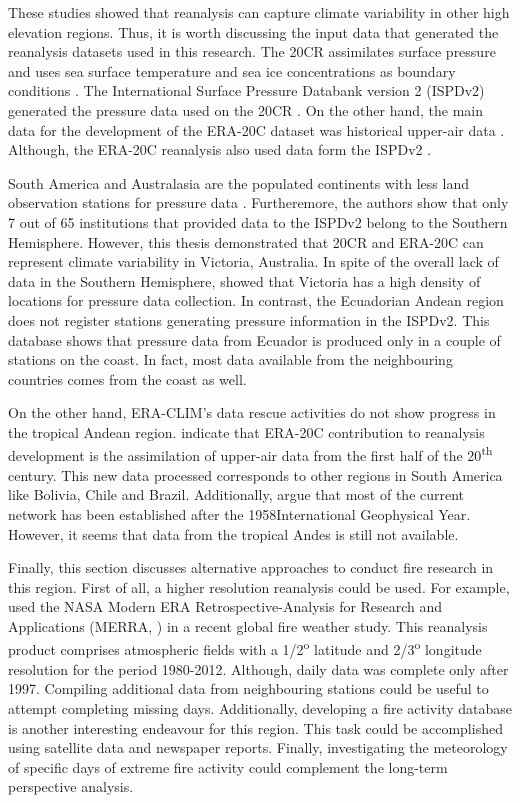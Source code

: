 These studies showed that reanalysis can capture climate variability
in other high elevation regions. Thus, it is worth discussing the
input data that generated the reanalysis datasets used in this research.
The 20CR assimilates surface pressure and uses sea surface temperature
and sea ice concentrations as boundary conditions \citep{Compo2011}.
The International Surface Pressure Databank version 2 (ISPDv2) generated
the pressure data used on the 20CR \citep{Cram2015}. On the other
hand, the main data for the development of the ERA-20C dataset was
historical upper-air data \citep{Stickler2014,Stickler2014a}. Although,
the ERA-20C reanalysis also used data form the ISPDv2 \citep{Poli2013,Cram2015}. 

South America and Australasia are the populated continents with less
land observation stations for pressure data \citep{Cram2015}. Furtheremore,
the authors show that only 7 out of 65 institutions that provided
data to the ISPDv2 belong to the Southern Hemisphere. However, this
thesis demonstrated that 20CR and ERA-20C can represent climate variability
in Victoria, Australia. In spite of the overall lack of data in the
Southern Hemisphere, \citet{Cram2015} showed that Victoria has a
high density of locations for pressure data collection. In contrast,
the Ecuadorian Andean region does not register stations generating
pressure information in the ISPDv2. This database shows that pressure
data from Ecuador is produced only in a couple of stations on the
coast. In fact, most data available from the neighbouring countries
comes from the coast as well. 

On the other hand, ERA-CLIM's data rescue activities do not show progress
in the tropical Andean region. \citet{Stickler2014} indicate that
ERA-20C contribution to reanalysis development is the assimilation
of upper-air data from the first half of the 20\textsuperscript{th}
century. This new data processed corresponds to other regions in South
America like Bolivia, Chile and Brazil. Additionally, \citet{Stickler2014}
argue that most of the current network has been established after
the 1958\textemdash International Geophysical Year\textemdash . However,
it seems that data from the tropical Andes is still not available.

Finally, this section discusses alternative approaches to conduct
fire research in this region. First of all, a higher resolution reanalysis
could be used. For example, \citet{Field2015} used the NASA Modern
ERA Retrospective-Analysis for Research and Applications (MERRA, \citet{Rienecker2011})
in a recent global fire weather study. This reanalysis product comprises
atmospheric fields with a 1/2\textsuperscript{o} latitude and 2/3\textsuperscript{o}
longitude resolution for the period 1980-2012. Although, daily data
was complete only after 1997. Compiling additional data from neighbouring
stations could be useful to attempt completing missing days. Additionally,
developing a fire activity database is another interesting endeavour
for this region. This task could be accomplished using satellite data
and newspaper reports. Finally, investigating the meteorology of specific
days of extreme fire activity could complement the long-term perspective
analysis. 


